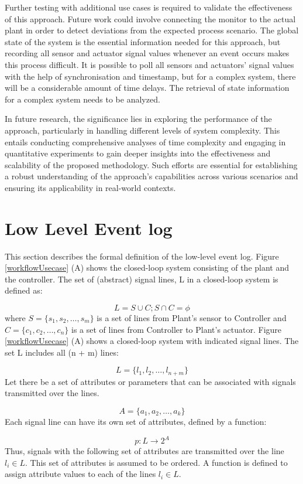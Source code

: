\begin{bibunit}
Further testing with additional use cases is required to validate the effectiveness of this approach. Future work could involve connecting the monitor to the actual plant in order to detect deviations from the expected process scenario. The global state of the system is the essential information needed for this approach, but recording all sensor and actuator signal values whenever an event occurs makes this process difficult. It is possible to poll all sensors and actuators' signal values with the help of synchronisation and timestamp, but for a complex system, there will be a considerable amount of time delays. The retrieval of state information for a complex system needs to be analyzed. 

In future research, the significance lies in exploring the performance of the approach, particularly in handling different levels of system complexity. This entails conducting comprehensive analyses of time complexity and engaging in quantitative experiments to gain deeper insights into the effectiveness and scalability of the proposed methodology. Such efforts are essential for establishing a robust understanding of the approach's capabilities across various scenarios and ensuring its applicability in real-world contexts.

\section{Low Level Event log}
\label{llel}

This section describes the formal definition of the low-level event log. 
Figure \ref{workflowUsecase} (A) shows the closed-loop system consisting of the plant and the controller. The set of (abstract) signal lines, L in a closed-loop system is defined as:

\[ L = S\cup C; S\cap C = \phi \]
where $ S=\{s_1,s_2,\dots,s_m\} $ is a set of lines from Plant’s sensor to Controller and $ C=\{c_1,c_2,\dots,c_n\} $ is a set of lines from Controller to Plant’s actuator. 
Figure \ref{workflowUsecase}  (A)  shows a closed-loop system with indicated signal lines. The set L includes all (n + m) lines: 

\[L=\{l_1,l_2,\dots,l_{n+m}\}\]
Let there be a set of attributes or parameters that can be associated with signals transmitted over the lines.

\[ A=\{a_1,a_2,\dots,a_k\} \]
Each signal line can have its own set of attributes, defined by a function:

\[p:L\rightarrow 2^A\]
Thus, signals with the following set of attributes are transmitted over the line $ l_i \in L$. This set of attributes is assumed to be ordered. A function is defined to assign attribute values to each of the lines  $ l_i \in L$.


\end{bibunit}
